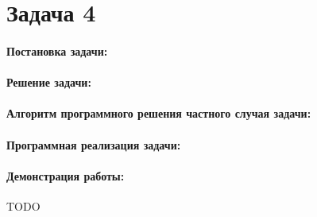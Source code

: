 {
   \section*{Задача 4}
   \paragraph{Постановка задачи:}
   \paragraph{Решение задачи:}
   \paragraph{Алгоритм программного решения частного случая задачи:}
   \paragraph{Программная реализация задачи:}
   \paragraph{Демонстрация работы:}
   TODO %
}
